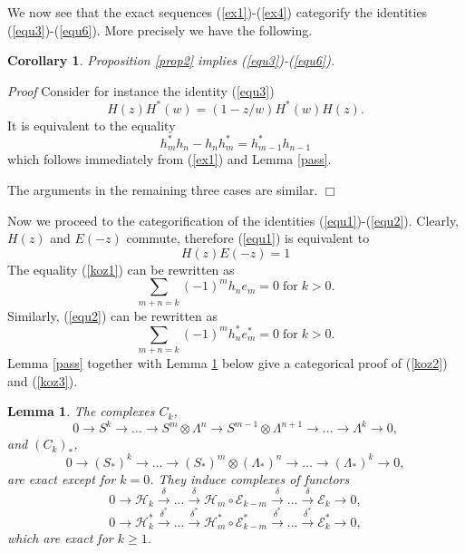 \documentclass[11pt]{amsart}
\newcounter{theorem}
\newtheorem{lemma}[theo]{Lemma}
\newtheorem{corollary}[theo]{Corollary}
\renewenvironment{proof}{ \emph{Proof}}{$\Box$}
\newcommand{\refle}[1]{Lemma \ref{#1}}
\newcommand{\refprop}[1]{Proposition \ref{#1}}
\newcommand{\refeq}[1]{(\ref{#1})}
\begin{document}
We now see that the exact sequences (\ref{ex1})-(\ref{ex4}) categorify the identities (\ref{equ3})-(\ref{equ6}).
More precisely we have the following.
\begin{corollary}\label{cat1} \refprop{prop2} implies (\ref{equ3})-(\ref{equ6}).
\end{corollary}
\begin{proof} Consider for instance the identity (\ref{equ3})
$$H(z)H^*(w)=(1-z/w)H^*(w)H(z).$$
It is equivalent to the equality
$$h^*_m h_n-h_n h^*_m=h^*_{m-1}h_{n-1}$$
which follows immediately from (\ref{ex1}) and Lemma
\ref{pass}.

The arguments in the remaining three cases are similar. 
\end{proof}

Now we proceed to the categorification of the identities (\ref{equ1})-(\ref{equ2}).
Clearly, $H(z)$ and $E(-z)$ commute, therefore  (\ref{equ1}) is
equivalent to 
\begin{equation}\label{koz1}
H(z)E(-z)=1
\end{equation}
The equality \refeq{koz1} can be rewritten as
\begin{equation}\label{koz2}
\sum_{m+n=k}(-1)^m{h}_n{e}_m=0\;\mathrm{for\;} k>0.
\end{equation}
Similarly, (\ref{equ2}) can be rewritten as 
\begin{equation}\label{koz3}
\sum_{m+n=k}(-1)^m{h}^*_n{e}^*_m=0\;\mathrm{for\;} k>0.
\end{equation}
Lemma \ref{pass} together with \refle{lemma5} below give a categorical
proof of (\ref{koz2}) and (\ref{koz3}).



\begin{lemma}\label{lemma5}
The complexes $C_k$,
$$0\rightarrow S^k\rightarrow ...\rightarrow S^m\otimes\Lambda^n\rightarrow S^{m-1}\otimes\Lambda^{n+1}\rightarrow ...\rightarrow\Lambda^k\rightarrow 0,$$
and $(C_k)_*$,
$$0\rightarrow (S_*)^k\rightarrow \dots\rightarrow (S_*)^m\otimes(\Lambda_*)^n\rightarrow ...\rightarrow(\Lambda_*)^k\rightarrow 0,$$
are exact except for $k=0$. They induce complexes of functors
\begin{equation}\label{le5eq1}
0\rightarrow \mathcal H_k\xrightarrow{\delta} ...\xrightarrow{\delta} \mathcal H_m\circ
 \mathcal  E_{k-m}\xrightarrow{\delta} ...\xrightarrow{\delta}\mathcal E_k\rightarrow 0,
\end{equation}
\begin{equation}\label{le5eq2}
0\rightarrow \mathcal H^*_k\xrightarrow{\delta^*} ...\xrightarrow{\delta^*} \mathcal H^*_m\circ
 \mathcal E^*_{k-m}\xrightarrow{\delta^*} ...\xrightarrow{\delta^*}\mathcal E^*_k\rightarrow 0,
\end{equation}
which are exact for $k\geq 1$.
\end{lemma}
\end{document}

